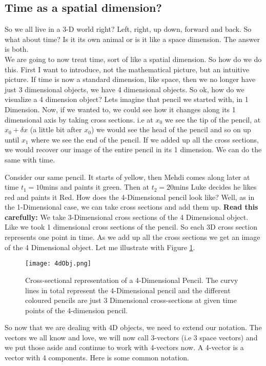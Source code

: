 \subsection{Time as a spatial dimension?}

So we all live in a 3-D world right? Left, right, up down, forward and back. So what about time? Is it its own animal or is it like a space dimension. The answer is both. \\

We are going to now treat time, sort of like a spatial dimension. So how do we do this. First I want to introduce, not the mathematical picture, but an intuitive picture. If time is now a standard dimension, like space, then we no longer have just 3 dimensional objects, we have 4 dimensional objects. So ok, how do we visualize a 4 dimension object? Lets imagine that pencil we started with, in 1 Dimension. Now, if we wanted to, we could see how it changes along its 1 dimensional axis by taking cross sections. i.e at $x_0$ we see the tip of the pencil, at $x_0+ \delta x$ (a little bit after $x_0$) we would see the head of the pencil and so on up until $x_1$ where we see the end of the pencil. If we added up all the cross sections, we would recover our image of the entire pencil in its 1 dimension. We can do the same with time. 

Consider our same pencil. It starts of yellow, then Mehdi comes along later at time $t_1=10$mins and paints it green. Then at $t_2=20$mins Luke decides he likes red and paints it Red. How does the 4-Dimensional pencil look like? Well, as in the 1-Dimensional case, we can take cross sections and add them up. \textbf{Read this carefully:} We take 3-Dimensional cross sections of the 4 Dimensional object. Like we took 1 dimensional cross sections of the pencil. So each 3D cross section represents one point in time. As we add up all the cross sections we get an image of the 4 Dimensional object. Let me illustrate with Figure \ref{fig:4dobj}. 

\begin{figure}[h]
\centering
\texttt{[image: 4dObj.png]}
\caption{Cross-sectional representation of a 4-Dimensional Pencil. The curvy lines in total represent the 4-Dimensional pencil and the different coloured pencils are just 3 Dimensional cross-sections at given time points of the 4-dimension pencil.}
\label{fig:4dobj}
\end{figure}

So now that we are dealing with 4D objects, we need to extend our notation. The vectors we all know and love, we will now call 3-vectors (i.e 3 space vectors) and we put those aside and continue to work with 4-vectors now. A 4-vector is a vector with 4 components. Here is some common notation. 

